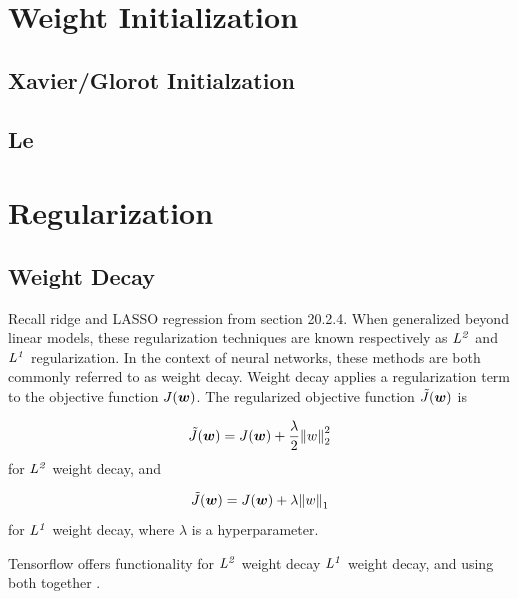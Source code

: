 \documentclass{article}
\begin{document}
\section{Weight Initialization}

\subsection{Xavier/Glorot Initialzation}

\subsection{Le}

\section{Regularization} %

\subsection{Weight Decay} %

Recall ridge and LASSO regression from section 20.2.4. When generalized beyond linear models, these regularization techniques are known respectively as \(\it{L}^2\) and \(\it{L}^1\) regularization. In the context of neural networks, these methods are both commonly referred to as weight decay. Weight decay applies a regularization term to the objective function \(J(\vb*{w})\). The regularized objective function \(\tilde{J}(\vb*{w})\) is 

\begin{equation}
    \tilde{J}(\vb*{w}) = J(\vb*{w}) +\frac{\lambda}{2}\norm{w}^2_2
    \label{L2-reg}
\end{equation} for \(\it{L}^2\) weight decay, and 

\begin{equation}
    \tilde{J}(\vb*{w}) = J(\vb*{w}) +\lambda\norm{w}_1
    \label{L1-reg}
\end{equation} for \(\it{L}^1\) weight decay, where \(\lambda\) is a hyperparameter.

Tensorflow offers functionality for \(\it{L}^2\) weight decay \(\it{L}^1\) weight decay, and using both together \cite{tensorflow2015-whitepaper}.


\end{document}

